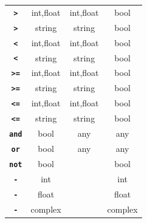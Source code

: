 \begin{center}
\begin{tabular}{c|c|c|c}
\texttt{\textbf{>}} & int,float   & int,float     & bool\\
\texttt{\textbf{>}} & string   & string     & bool\\
\texttt{\textbf{<}} & int,float   & int,float     & bool\\
\texttt{\textbf{<}} & string   & string     & bool\\
\texttt{\textbf{>=}} & int,float   & int,float     & bool\\
\texttt{\textbf{>=}} & string   & string     & bool\\
\texttt{\textbf{<=}}    & int,float   & int,float     & bool\\
\texttt{\textbf{<=}} & string   & string     & bool\\
\texttt{\textbf{and}} & bool & any & any\\
\texttt{\textbf{or}}   & bool & any & any\\
\texttt{\textbf{not}}    & bool &      & bool\\
\texttt{\textbf{-}}    & int &    & int\\
\texttt{\textbf{-}}    & float &    & float\\
\texttt{\textbf{-}}    & complex &    & complex

\end{tabular}
\end{center}

